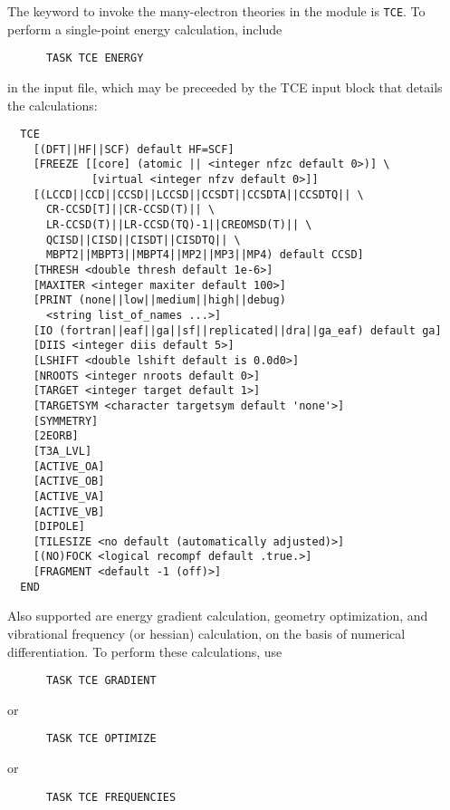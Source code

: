The keyword to invoke the many-electron theories in the module is
\verb+TCE+.  To perform a single-point energy calculation, include
\begin{verbatim}
      TASK TCE ENERGY
\end{verbatim}
in the input file, which may be preceeded by the TCE input block
that details the calculations:
\begin{verbatim}
  TCE
    [(DFT||HF||SCF) default HF=SCF]
    [FREEZE [[core] (atomic || <integer nfzc default 0>)] \
             [virtual <integer nfzv default 0>]]
    [(LCCD||CCD||CCSD||LCCSD||CCSDT||CCSDTA||CCSDTQ|| \
      CR-CCSD[T]||CR-CCSD(T)|| \
      LR-CCSD(T)||LR-CCSD(TQ)-1||CREOMSD(T)|| \
      QCISD||CISD||CISDT||CISDTQ|| \
      MBPT2||MBPT3||MBPT4||MP2||MP3||MP4) default CCSD]
    [THRESH <double thresh default 1e-6>]
    [MAXITER <integer maxiter default 100>]
    [PRINT (none||low||medium||high||debug)
      <string list_of_names ...>]
    [IO (fortran||eaf||ga||sf||replicated||dra||ga_eaf) default ga]
    [DIIS <integer diis default 5>]
    [LSHIFT <double lshift default is 0.0d0>]
    [NROOTS <integer nroots default 0>]
    [TARGET <integer target default 1>]
    [TARGETSYM <character targetsym default 'none'>]
    [SYMMETRY]
    [2EORB]
    [T3A_LVL] 
    [ACTIVE_OA]
    [ACTIVE_OB]
    [ACTIVE_VA]
    [ACTIVE_VB]
    [DIPOLE]
    [TILESIZE <no default (automatically adjusted)>]
    [(NO)FOCK <logical recompf default .true.>]
    [FRAGMENT <default -1 (off)>]
  END
\end{verbatim}
Also supported are energy gradient calculation, geometry optimization,
and vibrational frequency (or hessian) calculation, on the basis of
numerical differentiation.  To perform these calculations, use
\begin{verbatim}
      TASK TCE GRADIENT
\end{verbatim}
or
\begin{verbatim}
      TASK TCE OPTIMIZE
\end{verbatim}
or
\begin{verbatim}
      TASK TCE FREQUENCIES
\end{verbatim}

